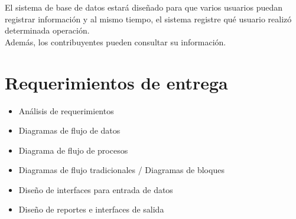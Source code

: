 \documentclass[12pt,spanish,lettersize]{article}
\begin{document}
El sistema de base de datos estar\'a dise\~nado para que varios usuarios puedan registrar informaci\'on y al mismo tiempo, el sistema registre qu\'e usuario realiz\'o determinada operaci\'on.\\

Adem\'as, los contribuyentes pueden consultar su informaci\'on.
\section{Requerimientos de entrega}
\begin{itemize}
\item Análisis de requerimientos
\item Diagramas de flujo de datos
\item Diagrama de flujo de procesos
\item Diagramas de flujo tradicionales / Diagramas de bloques
\item Diseño de interfaces para entrada de datos
\item Diseño de reportes e interfaces de salida
\end{itemize}
\end{document}
